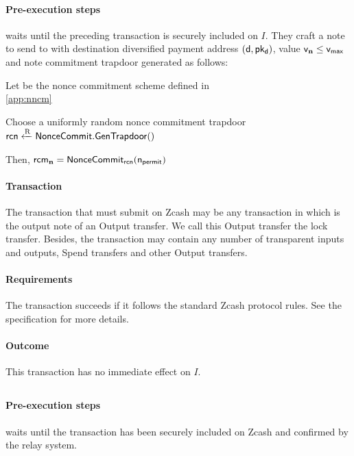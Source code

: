 \paragraph{Pre-execution steps}
\issuer waits until the preceding \requestLock transaction is securely included on $I$.
They craft a note \n to send to \vault with destination diversified payment address $(\mathsf{d}, \mathsf{pk_d})$, value $\mathsf{v_{\mathbf{n}}} \leq \mathsf{v_{max}}$ and note commitment trapdoor \rcmn generated as follows:
\begin{alg}
    \item Let \nncm be the nonce commitment scheme defined in\\ \cref{app:nncm}
    \item Choose a uniformly random nonce commitment trapdoor $\mathsf{rcn} \xleftarrow{\text{R}}\\ \mathsf{NonceCommit}.\mathsf{GenTrapdoor()}$
    \item Then, $\mathsf{rcm_{\mathbf{n}}} = \mathsf{NonceCommit}_{\mathsf{rcn}}(\mathsf{n_{permit}})$
\end{alg}

\paragraph{Transaction}
The \lock transaction that \issuer must submit on Zcash may be any transaction in which \n is the output note of an Output transfer.
We call this Output transfer the lock transfer.
Besides, the \lock transaction may contain any number of transparent inputs and outputs, Spend transfers and other Output transfers.

\paragraph{Requirements}
The \lock transaction succeeds if it follows the standard Zcash protocol rules.
See the specification for more details.

\paragraph{Outcome}
This transaction has no immediate effect on $I$.

\subsection{\mintop}
\label{sec:mint}

\paragraph{Pre-execution steps}
\issuer waits until the \lock transaction has been securely included on Zcash and confirmed by the relay system.

